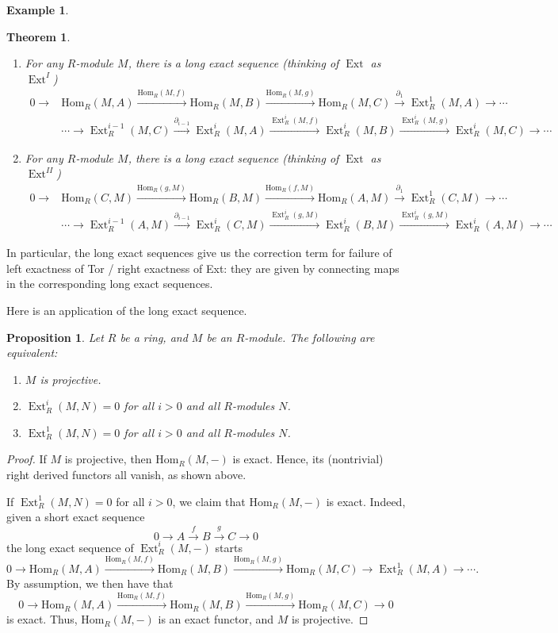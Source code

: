 \documentclass{amsart}[12pt]
\newcommand{\Hom}{\mathrm{Hom}}
\def\Ext{\operatorname{Ext}}
\numberwithin{equation}{section}
\theoremstyle{plain} %
\newtheorem{thm}[equation]{Theorem}
\newtheorem{prop}[equation]{Proposition}
\theoremstyle{definition}
\newtheorem{ex}[equation]{Example}
\theoremstyle{remark}
\newcommand{\xra}[1]{\xrightarrow{#1}}
\begin{document}
\begin{ex}
\begin{thm}
\begin{enumerate}
         \item For any $R$-module $M$, there is a long exact sequence (thinking of $\Ext$ as $\Ext^I$)
    \[\begin{aligned}
  0 \to &\Hom_R(M,A) \xra{\Hom_R(M,f)} \Hom_R(M,B) \xra{\Hom_R(M,g)} \Hom_R(M,C) \xra{\partial_1 } \Ext^1_R(M,A) \to \cdots\\
  &\cdots \to  \Ext^{i-1}_R(M,C) \xra{\partial_{i-1}} \Ext^i_R(M,A) \xra{\Ext^i_R(M,f)}  \Ext^i_R(M,B) \xra{\Ext^i_R(M,g)}  \Ext^i_R(M,C) \to\cdots
  \end{aligned}\]
  
      \item For any $R$-module $M$, there is a long exact sequence (thinking of $\Ext$ as $\Ext^{II}$)
    \[\begin{aligned}
  0 \to &\Hom_R(C,M) \xra{\Hom_R(g,M)} \Hom_R(B,M) \xra{\Hom_R(f,M)} \Hom_R(A,M) \xra{\partial_1 } \Ext^1_R(C,M) \to \cdots\\
  &\cdots \to  \Ext^{i-1}_R(A,M) \xra{\partial_{i-1}} \Ext^i_R(C,M) \xra{\Ext^i_R(g,M)}  \Ext^i_R(B,M) \xra{\Ext^i_R(g,M)}  \Ext^i_R(A,M) \to\cdots
  \end{aligned}\]
    \end{enumerate}
    \end{thm}
    
    
In particular, the long exact sequences give us the correction term for failure of left exactness of Tor / right exactness of Ext: they are given by connecting maps in the corresponding long exact sequences.

Here is an application of the long exact sequence.

\begin{prop} Let $R$ be a ring, and $M$ be an $R$-module. The following are equivalent:
\begin{enumerate}
\item $M$ is projective.
\item $\Ext^i_R(M,N)=0$ for all $i>0$ and all $R$-modules $N$.
\item $\Ext^1_R(M,N)=0$ for all $i>0$ and all $R$-modules $N$.
\end{enumerate}
\end{prop}
\begin{proof}
If $M$ is projective, then $\Hom_R(M,-)$ is exact. Hence, its (nontrivial) right derived functors all vanish, as shown above.

If  $\Ext^1_R(M,N)=0$ for all $i>0$, we claim that $\Hom_R(M,-)$ is exact. Indeed, given a short exact sequence
  \[ 0 \to A \xra{f} B \xra{g} C \to 0\]
  the long exact sequence of $\Ext^i_R(M,-)$ starts
  \[  0 \to \Hom_R(M,A) \xra{ \Hom_R(M,f)}  \Hom_R(M,B) \xra{ \Hom_R(M,g)}  \Hom_R(M,C) \to \Ext^1_R(M,A) \to \cdots.\]
  By assumption, we then have that  \[  0 \to \Hom_R(M,A) \xra{ \Hom_R(M,f)}  \Hom_R(M,B) \xra{ \Hom_R(M,g)}  \Hom_R(M,C) \to 0 \]is exact. Thus, $\Hom_R(M,-)$ is an exact functor, and $M$ is projective.
  \end{proof}
  

\end{ex}
\end{document}
